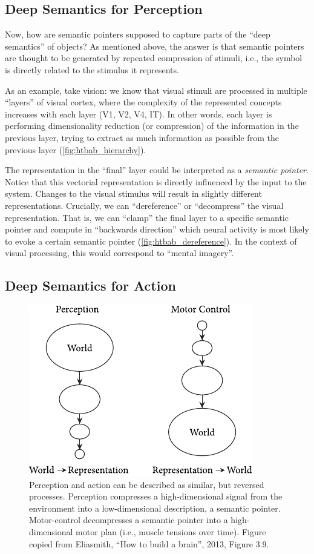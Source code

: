 \documentclass[10pt,letterpaper,oneside]{article}
\begin{document}
\subsection{Deep Semantics for Perception}

Now, how are semantic pointers supposed to capture parts of the \enquote{deep semantics} of objects? As mentioned above, the answer is that semantic pointers are thought to be generated by repeated compression of stimuli, i.e., the symbol is directly related to the stimulus it represents.

As an example, take vision: we know that visual stimuli are processed in multiple \enquote{layers} of visual cortex, where the complexity of the represented concepts increases with each layer (V1, V2, V4, IT). In other words, each layer is performing dimensionality reduction (or compression) of the information in the previous layer, trying to extract as much information as possible from the previous layer (\cref{fig:htbab_hierarchy}).

The representation in the \enquote{final} layer could be interpreted as a \emph{semantic pointer}. Notice that this vectorial representation is directly influenced by the input to the system. Changes to the visual stimulus will result in slightly different representations. Crucially, we can \enquote{dereference} or \enquote{decompress} the visual representation. That is, we can \enquote{clamp} the final layer to a specific semantic pointer and compute in \enquote{backwards direction} which neural activity is most likely to evoke a certain semantic pointer (\cref{fig:htbab_dereference}). In the context of visual processing, this would correspond to \enquote{mental imagery}.

\subsection{Deep Semantics for Action}

\begin{figure}
	\centering
	\includegraphics{media/htbab_perceptual_motor.pdf}
	\caption{Perception and action can be described as similar, but reversed processes. Perception compresses a high-dimensional signal from the environment into a low-dimensional description, a semantic pointer. Motor-control decompresses a semantic pointer into a high-dimensional motor plan (i.e., muscle tensions over time). Figure copied from Eliasmith, \enquote{How to build a brain}, 2013, Figure 3.9.}
\end{figure}
\end{document}
